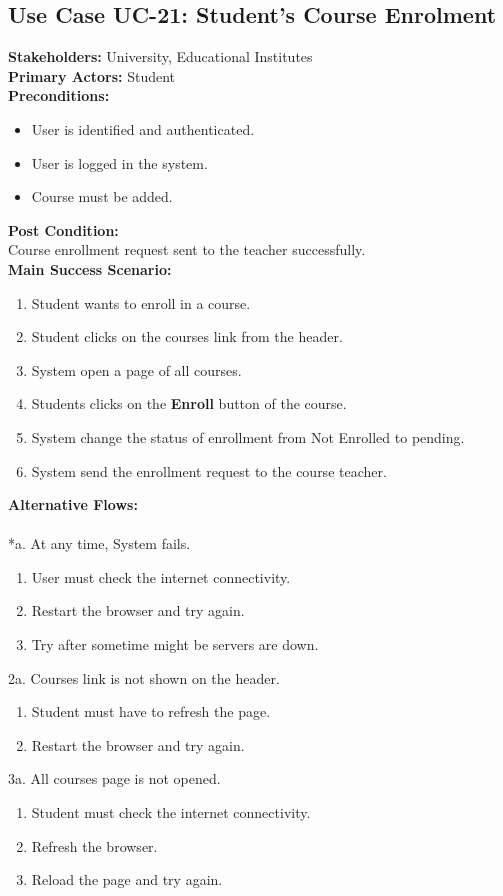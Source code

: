 \subsection{Use Case UC-21: Student's Course Enrolment}
\textbf{Stakeholders: } University, Educational Institutes \\
\textbf{Primary Actors: }Student \\
\textbf{Preconditions:}
\begin{itemize}
\item User is identified and authenticated.
\item User is logged in the system.
\item Course must be added.
\end{itemize}
\textbf{Post Condition: }\\
Course enrollment request sent to the teacher successfully.\\
\textbf{Main Success Scenario:}
\begin{enumerate}
\item Student wants to enroll in a course.
\item Student clicks on the courses link from the header.
\item System open a page of all courses.
\item Students clicks on the \textbf{Enroll} button of the course.
\item System change the status of enrollment from Not Enrolled to pending.
\item System send the enrollment request to the course teacher.
\end{enumerate}
\textbf{Alternative Flows:}\\
\\
*a. At any time, System fails.
\begin{enumerate}
\item User must check the internet connectivity.
\item Restart the browser and try again.
\item Try after sometime might be servers are down.
\end{enumerate}
2a. Courses link is not shown on the header.
\begin{enumerate}
\item Student must have to refresh the page.
\item Restart the browser and try again.
\end{enumerate} 
3a. All courses page is not opened.
\begin{enumerate}
\item Student must check the internet connectivity.
\item Refresh the browser.
\item Reload the page and try again.
\end{enumerate}

